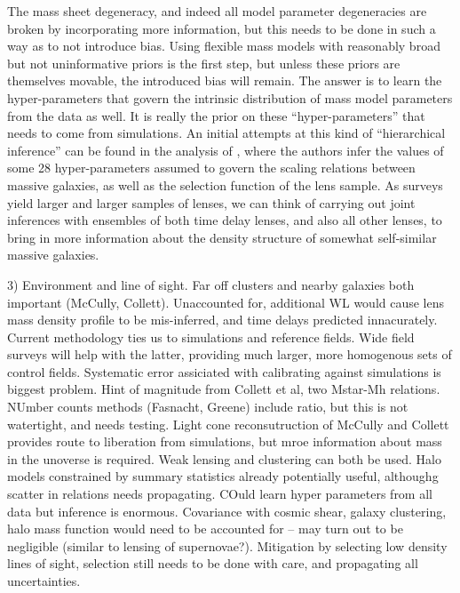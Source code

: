 The mass sheet degeneracy, and indeed all model parameter degeneracies
are broken by incorporating more information, but this needs to be done
in such a way as to not introduce bias. Using flexible mass models with
reasonably broad but not uninformative  priors is the first step, but
unless these priors are themselves movable, the introduced bias will
remain. The answer is to learn the hyper-parameters that govern the
intrinsic distribution of mass model parameters from the data as well. It is
really the prior on these ``hyper-parameters'' that  needs to come from
simulations. An initial attempts at this kind of ``hierarchical
inference'' can be found in  the analysis of \citet{SonnenfeldEtal2015},
where the authors  infer the values of some 28 hyper-parameters assumed
to govern the  scaling relations between massive galaxies, as well as
the selection function of the lens sample. As surveys yield larger and
larger samples of lenses, we can think of  carrying out joint inferences
with ensembles of both time delay lenses, and also all other lenses, to
bring in more information about the density structure of somewhat
self-similar massive galaxies.


3) Environment and line of sight. Far off clusters and nearby galaxies
both important (McCully, Collett). Unaccounted for, additional WL
would cause lens mass density profile to be mis-inferred, and
time delays predicted innacurately.
Current methodology ties us to
simulations and reference fields. Wide field surveys will help with the
latter, providing much larger, more homogenous sets of control fields.
Systematic error assiciated with calibrating against simulations is
biggest problem. Hint of magnitude from Collett et al, two Mstar-Mh
relations. NUmber counts methods (Fasnacht, Greene) include ratio, but
this is not  watertight, and needs testing. Light cone reconsutruction
of McCully and Collett provides route to liberation from simulations,
but mroe information about  mass in the unoverse is required. Weak
lensing and clustering can both be used. Halo models constrained by
summary statistics already potentially  useful, althoughg scatter in
relations needs propagating.  COuld learn hyper parameters from all data
but inference is enormous. Covariance with cosmic shear, galaxy
clustering, halo mass function would need to be accounted for -- may
turn out to be negligible (similar to lensing of supernovae?). Mitigation
by selecting low density lines of sight, selection still needs to be done
with care, and propagating all uncertainties.


